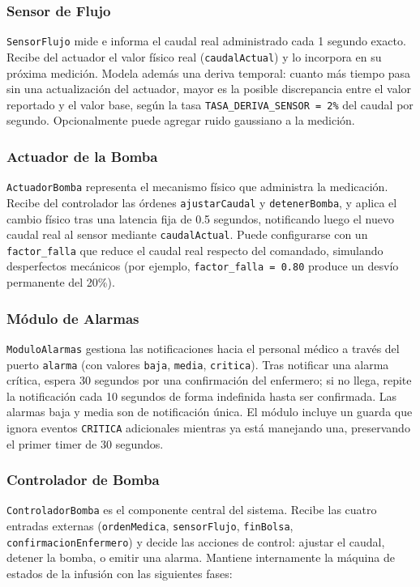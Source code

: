 \documentclass[12pt,a4paper]{article}
\begin{document}
\subsubsection{Sensor de Flujo}
\texttt{SensorFlujo} mide e informa el caudal real administrado cada
1 segundo exacto.  Recibe del actuador el valor físico real
(\texttt{caudalActual}) y lo incorpora en su próxima medición.  Modela
además una deriva temporal: cuanto más tiempo pasa sin una actualización
del actuador, mayor es la posible discrepancia entre el valor reportado
y el valor base, según la tasa \texttt{TASA\_DERIVA\_SENSOR = 2\%}
del caudal por segundo.  Opcionalmente puede agregar ruido gaussiano a
la medición.

\subsubsection{Actuador de la Bomba}
\texttt{ActuadorBomba} representa el mecanismo físico que administra la
medicación.  Recibe del controlador las órdenes \texttt{ajustarCaudal} y
\texttt{detenerBomba}, y aplica el cambio físico tras una latencia fija
de 0.5 segundos, notificando luego el nuevo caudal real al sensor mediante
\texttt{caudalActual}.  Puede configurarse con un \texttt{factor\_falla}
que reduce el caudal real respecto del comandado, simulando desperfectos
mecánicos (por ejemplo, \texttt{factor\_falla = 0.80} produce un desvío
permanente del 20\%).

\subsubsection{Módulo de Alarmas}
\texttt{ModuloAlarmas} gestiona las notificaciones hacia el personal
médico a través del puerto \texttt{alarma} (con valores \texttt{baja},
\texttt{media}, \texttt{critica}).  Tras notificar una alarma crítica,
espera 30 segundos por una confirmación del enfermero; si no llega,
repite la notificación cada 10 segundos de forma indefinida hasta ser
confirmada.  Las alarmas baja y media son de notificación única.
El módulo incluye un guarda que ignora eventos \texttt{CRITICA}
adicionales mientras ya está manejando una, preservando el primer
timer de 30 segundos.

\subsubsection{Controlador de Bomba}
\texttt{ControladorBomba} es el componente central del sistema.  Recibe
las cuatro entradas externas (\texttt{ordenMedica}, \texttt{sensorFlujo},
\texttt{finBolsa}, \texttt{confirmacionEnfermero}) y decide las acciones
de control: ajustar el caudal, detener la bomba, o emitir una alarma.
Mantiene internamente la máquina de estados de la infusión con las
siguientes fases:
\end{document}
